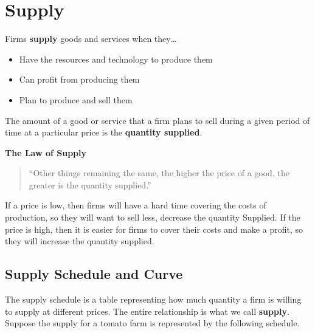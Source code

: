 \documentclass[
]{book}
\providecommand{\tightlist}{%
  \setlength{\itemsep}{0pt}\setlength{\parskip}{0pt}}
\begin{document}
\section{Supply}\label{supply}

Firms \textbf{supply} goods and services when they\ldots{}

\begin{itemize}
\tightlist
\item
  Have the resources and technology to produce them
\item
  Can profit from producing them
\item
  Plan to produce and sell them
\end{itemize}

The amount of a good or service that a firm plans to sell during a given period of time at a particular price is the \textbf{quantity supplied}.

\textbf{The Law of Supply}

\begin{quote}
``Other things remaining the same, the higher the price of a good, the greater is the quantity supplied.''
\end{quote}

If a price is low, then firms will have a hard time covering the costs of production, so they will want to sell less, decrease the quantity Supplied. If the price is high, then it is easier for firms to cover their costs and make a profit, so they will increase the quantity supplied.

\subsection{Supply Schedule and Curve}\label{supply-schedule-and-curve}

The supply schedule is a table representing how much quantity a firm is willing to supply at different prices. The entire relationship is what we call \textbf{supply}. Suppose the supply for a tomato farm is represented by the following schedule.
\end{document}
